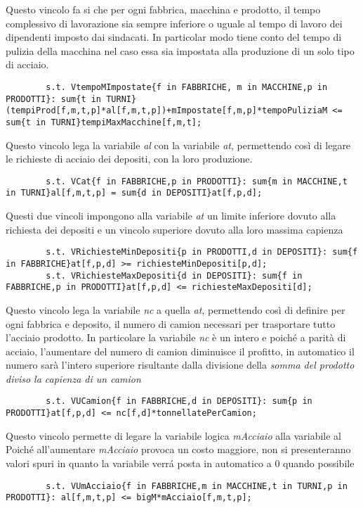 \documentclass[12pt]{article} %
\begin{document}
		Questo vincolo fa si che per ogni fabbrica, macchina e prodotto, il tempo complessivo di lavorazione sia sempre inferiore o uguale al tempo di lavoro dei dipendenti imposto dai sindacati.
		In particolar modo tiene conto del tempo di pulizia della macchina nel caso essa sia impostata alla produzione di un solo tipo di acciaio.
		\begin{lstlisting}
		s.t. VtempoMImpostate{f in FABBRICHE, m in MACCHINE,p in PRODOTTI}: sum{t in TURNI}(tempiProd[f,m,t,p]*al[f,m,t,p])+mImpostate[f,m,p]*tempoPuliziaM <= sum{t in TURNI}tempiMaxMacchine[f,m,t];
		\end{lstlisting}

		Questo vincolo lega la variabile \textit{al} con la variabile \textit{at}, permettendo così di legare le richieste di acciaio dei depositi, con la loro produzione.
		\begin{lstlisting}
		s.t. VCat{f in FABBRICHE,p in PRODOTTI}: sum{m in MACCHINE,t in TURNI}al[f,m,t,p] = sum{d in DEPOSITI}at[f,p,d];
		\end{lstlisting}

		Questi due vincoli impongono alla variabile \textit{at} un limite inferiore dovuto alla richiesta dei depositi e un vincolo superiore dovuto alla loro massima capienza
		\begin{lstlisting}
		s.t. VRichiesteMinDepositi{p in PRODOTTI,d in DEPOSITI}: sum{f in FABBRICHE}at[f,p,d] >= richiesteMinDepositi[p,d];
		s.t. VRichiesteMaxDepositi{d in DEPOSITI}: sum{f in FABBRICHE,p in PRODOTTI}at[f,p,d] <= richiesteMaxDepositi[d];
		\end{lstlisting}

		Questo vincolo lega la variabile \textit{nc} a quella \textit{at}, permettendo così di definire per ogni fabbrica e deposito, il numero di camion necessari per trasportare tutto l'acciaio prodotto.
		In particolare la variabile \textit{nc} è un intero e poich\'e a parità di acciaio, l'aumentare del numero di camion diminuisce il profitto, in automatico il numero sarà l'intero superiore risultante dalla divisione della \textit{somma del prodotto diviso la capienza di un camion}
		\begin{lstlisting}
		s.t. VUCamion{f in FABBRICHE,d in DEPOSITI}: sum{p in PRODOTTI}at[f,p,d] <= nc[f,d]*tonnellatePerCamion;
		\end{lstlisting}

		Questo vincolo permette di legare la variabile logica \textit{mAcciaio} alla variabile al
		Poich\'e all'aumentare \textit{mAcciaio} provoca un costo maggiore, non si presenteranno valori spuri in quanto la variabile verr\'a posta in automatico a 0 quando possibile
		\begin{lstlisting}
		s.t. VUmAcciaio{f in FABBRICHE,m in MACCHINE,t in TURNI,p in PRODOTTI}: al[f,m,t,p] <= bigM*mAcciaio[f,m,t,p];
		\end{lstlisting}
\end{document}
